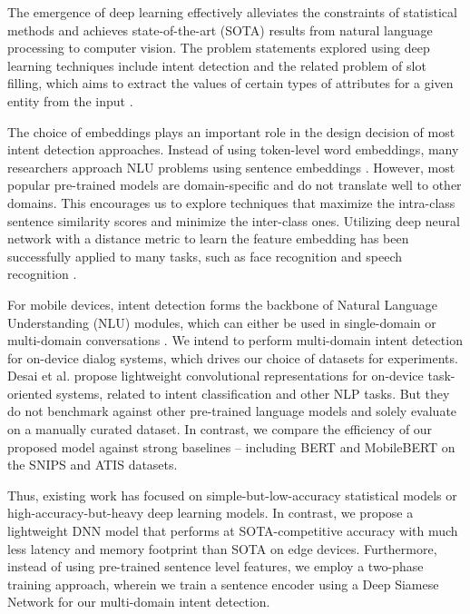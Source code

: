 \documentclass[conference]{IEEEtran}
\begin{document}
The emergence of deep learning effectively alleviates the constraints of statistical methods and achieves state-of-the-art (SOTA) results from natural language processing to computer vision. The problem statements explored using deep learning techniques include intent detection and the related problem of slot filling, which aims to extract the values of certain types of attributes for a given entity from the input \cite{qin2019stackpropagation}.

The choice of embeddings plays an important role in the design decision of most intent detection approaches. Instead of using token-level word embeddings, many researchers approach NLU problems using sentence embeddings \cite{reimers-gurevych-2019-sentence}. However, most popular pre-trained models are domain-specific and do not translate well to other domains. This encourages us to explore techniques that maximize the intra-class sentence similarity scores and minimize the inter-class ones. Utilizing deep neural network with a distance metric to learn the feature embedding has been successfully applied to many tasks, such as face recognition \cite{7298682} and speech recognition \cite{Zhang2017}.

For mobile devices, intent detection forms the backbone of Natural Language Understanding (NLU) modules, which can either be used in single-domain or multi-domain conversations \cite{Rastogi_Zang_Sunkara_Gupta_Khaitan_2020}.
We intend to perform multi-domain intent detection for on-device dialog systems, which drives our choice of datasets for experiments. Desai et al. \cite{desai2020lightweight} propose lightweight convolutional representations for on-device task-oriented systems, related to intent classification and other NLP tasks. But they do not benchmark against other pre-trained language models and solely evaluate on a manually curated dataset. In contrast, we compare the efficiency of our proposed model against strong baselines -- including BERT \cite{devlin2019bert} and MobileBERT \cite{sun-etal-2020-mobilebert} on the SNIPS \cite{coucke2018snips} and ATIS \cite{price-1990-evaluation} datasets.

Thus, existing work has focused on simple-but-low-accuracy statistical models or high-accuracy-but-heavy deep learning models. In contrast, we propose a lightweight DNN model that performs at SOTA-competitive accuracy with much less latency and memory footprint than SOTA on edge devices. Furthermore, instead of using pre-trained sentence level features, we employ a two-phase training approach, wherein we train a sentence encoder using a Deep Siamese Network for our multi-domain intent detection.
\end{document}
